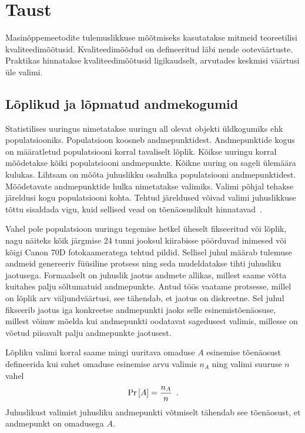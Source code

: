 \section{Taust}
Masinõppemeetodite tulemuslikkuse mõõtmiseks kasutatakse mitmeid teoreetilisi kvaliteedimõõtusid. Kvaliteedimõõdud on defineeritud läbi nende ooteväärtuste. Praktikas hinnatakse kvaliteedimõõtusid ligikaudselt, arvutades keskmisi väärtusi üle valimi.

\subsection{Lõplikud ja lõpmatud andmekogumid}
Statistilises uuringus nimetatakse uuringu all olevat objekti üldkogumiks ehk populatsiooniks. Populatsioon koosneb andmepunktidest. Andmepunktide kogus on määratletud populatsiooni korral tavaliselt lõplik. Kõikse uuringu korral mõõdetakse kõiki populatsiooni andmepunkte. Kõikne uuring on sageli ülemäära kulukas. Lihtsam on mõõta juhuslikku osahulka populatsiooni andmepunktidest. Mõõdetavate andmepunktide hulka nimetatakse valimiks. Valimi põhjal tehakse järeldusi kogu populatsiooni kohta. Tehtud järeldused võivad valimi juhuslikkuse tõttu sisaldada vigu, kuid sellised vead on tõenäosuslikult hinnatavad~\cite{rakendusstatisika-algkursus}.

Vahel pole populatsioon uuringu tegemise hetkel üheselt fikseeritud või lõplik, nagu näiteks kõik järgmise 24 tunni jooksul kiirabisse pöörduvad inimesed või kõigi Canon 70D fotokaameratega tehtud pildid. Sellisel juhul määrab tulemuse andmeid genereeriv füüsiline protsess ning seda mudeldatakse tihti juhusliku jaotusega. Formaalselt on juhuslik jaotus andmete allikas, millest saame võtta kuitahes palju sõltumatuid andmepunkte. Antud töös vaatame protsesse, millel on lõplik arv väljundväärtusi, see tähendab, et jaotus on diskreetne. Sel juhul fikseerib jaotus iga konkreetse andmepunkti jaoks selle esinemistõenäosuse, millest võimw mõelda kui andmepunkti oodatavat sagedusest valimis, millesse on võetud piisavalt palju andmepunkte jaotusest.

Lõpliku valimi korral saame mingi uuritava omaduse $A$ esinemise tõenäosust defineerida kui suhet omaduse esinemise arvu valimis $n_A$ ning valimi suuruse $n$ vahel
\begin{equation*}
    \Pr\left[A\right] = \frac{n_A}{n} \enspace.
\end{equation*}
Juhuslikust valimist juhusliku andmepunkti võtmiselt tähendab see tõenäosust, et andmepunkt on omadusega $A$.

